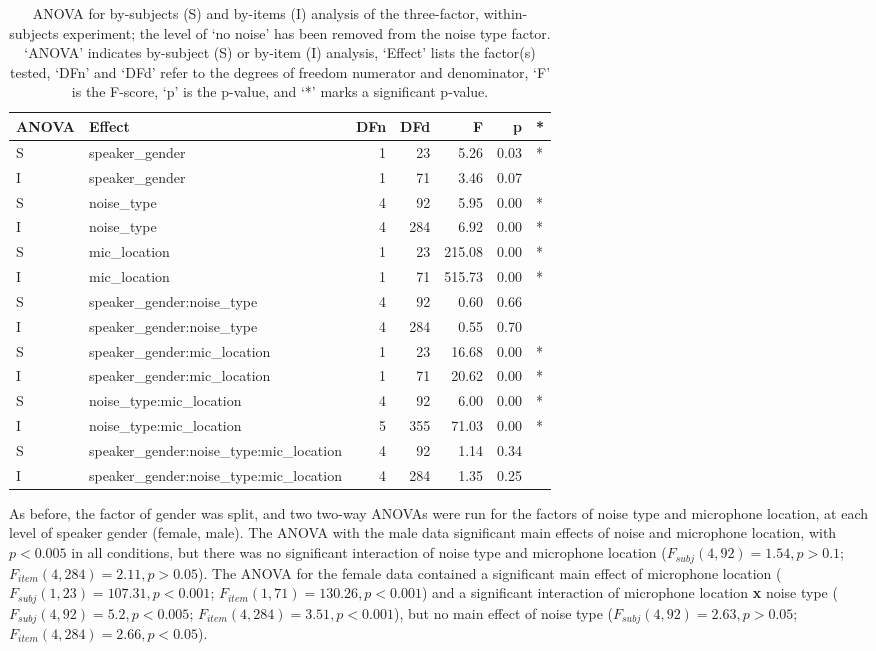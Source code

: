 \begin{table}[ht]
\centering
\begin{tabular}{llrrrrl}
  \hline
ANOVA & Effect & DFn & DFd & F & p & * \\ 
  \hline
S & speaker\_gender & 1 & 23 & 5.26 & 0.03 & * \\ 
  I & speaker\_gender & 1 & 71 & 3.46 & 0.07 &  \\ 
  S & noise\_type & 4 & 92 & 5.95 & 0.00 & * \\ 
  I & noise\_type & 4 & 284 & 6.92 & 0.00 & * \\ 
  S & mic\_location & 1 & 23 & 215.08 & 0.00 & * \\ 
  I & mic\_location & 1 & 71 & 515.73 & 0.00 & * \\ 
  S & speaker\_gender:noise\_type & 4 & 92 & 0.60 & 0.66 &  \\ 
  I & speaker\_gender:noise\_type & 4 & 284 & 0.55 & 0.70 &  \\ 
  S & speaker\_gender:mic\_location & 1 & 23 & 16.68 & 0.00 & * \\ 
  I & speaker\_gender:mic\_location & 1 & 71 & 20.62 & 0.00 & * \\ 
  S & noise\_type:mic\_location & 4 & 92 & 6.00 & 0.00 & * \\ 
  I & noise\_type:mic\_location & 5 & 355 & 71.03 & 0.00 & * \\ 
  S & speaker\_gender:noise\_type:mic\_location & 4 & 92 & 1.14 & 0.34 &  \\ 
  I & speaker\_gender:noise\_type:mic\_location & 4 & 284 & 1.35 & 0.25 &  \\ 
   \hline
\end{tabular}
\caption{ANOVA for by-subjects (S) and by-items (I) analysis of the three-factor, within-subjects experiment; the level of `no noise' has been removed from the noise type factor. \DIFaddbeginFL {}\DIFaddendFL `ANOVA' indicates by-subject (S) or by-item (I) analysis, `Effect' lists the factor(s) tested, `DFn' and `DFd' refer to the degrees of freedom numerator and denominator, `F' is the F-score, `p' is the p-value, and `*' marks a significant p-value.} 
\label{tab:anova2}
\end{table}


As before, the factor of gender was split, and two two-way ANOVAs were run for the factors of noise type and microphone location, at each level of speaker gender (female, male).  The ANOVA with the male data \DIFdelbegin {}\DIFdelend \DIFaddbegin {}\DIFaddend significant main effects of noise and microphone location, with $p<0.005$ in all conditions, but there was no significant interaction of noise type and microphone location ($F_{subj}(4,92)=1.54, p>0.1$; $F_{item}(4,284)=2.11, p>0.05$).  The ANOVA for the female data contained a significant main effect of microphone location ($F_{subj}(1,23)=107.31, p<0.001$; $F_{item}(1,71)=130.26, p<0.001$) and a significant interaction of microphone location \textbf{x} noise type ($F_{subj}(4,92)=5.2, p<0.005$; $F_{item}(4,284)=3.51, p<0.001$), but no main effect of noise type ($F_{subj}(4,92)=2.63, p>0.05$; $F_{item}(4,284)=2.66, p<0.05$).


